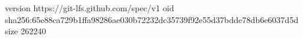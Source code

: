 version https://git-lfs.github.com/spec/v1
oid sha256:65e88ca729b1ffa98286ae030b72232dc35739f92e55d37bdde78db6e6037d5d
size 262240
